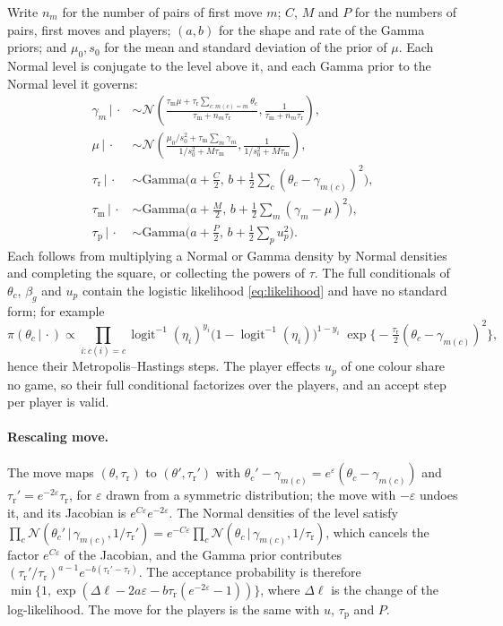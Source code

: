\documentclass[12pt]{article}
\newcommand{\given}{\,\vert\,}
\newcommand{\logistic}{\operatorname{logit}^{-1}}
\newcommand{\Normal}{\mathcal{N}}
\newcommand{\Gam}{\text{Gamma}}
\newcommand{\taum}{\tau_{\mathrm{m}}}
\newcommand{\taur}{\tau_{\mathrm{r}}}
\newcommand{\taup}{\tau_{\mathrm{p}}}
\begin{document}
Write $n_m$ for the number of pairs of first move $m$; $C$, $M$ and $P$ for the numbers of pairs, first moves and players; $(a, b)$ for the shape and rate of the Gamma priors; and $\mu_0, s_0$ for the mean and standard deviation of the prior of $\mu$. Each Normal level is conjugate to the level above it, and each Gamma prior to the Normal level it governs:
\begin{align*}
  \gamma_m \given \cdot &\sim \Normal\!\left(\frac{\taum \mu + \taur \sum_{c: m(c) = m} \theta_c}{\taum + n_m \taur}, \frac{1}{\taum + n_m \taur}\right),\\
  \mu \given \cdot &\sim \Normal\!\left(\frac{\mu_0 / s_0^2 + \taum \sum_m \gamma_m}{1/s_0^2 + M \taum}, \frac{1}{1/s_0^2 + M \taum}\right),\\
  \taur \given \cdot &\sim \Gam\Big(a + \tfrac{C}{2},\, b + \tfrac12 \sum_c (\theta_c - \gamma_{m(c)})^2\Big),\\
  \taum \given \cdot &\sim \Gam\Big(a + \tfrac{M}{2},\, b + \tfrac12 \sum_m (\gamma_m - \mu)^2\Big),\\
  \taup \given \cdot &\sim \Gam\Big(a + \tfrac{P}{2},\, b + \tfrac12 \sum_p u_p^2\Big).
\end{align*} Each follows from multiplying a Normal or Gamma density by Normal densities and completing the square, or collecting the powers of $\tau$. The full conditionals of $\theta_c$, $\beta_g$ and $u_p$ contain the logistic likelihood \eqref{eq:likelihood} and have no standard form; for example
\[
  \pi(\theta_c \given \cdot) \propto \prod_{i: c(i) = c} \logistic(\eta_i)^{y_i}\big(1 - \logistic(\eta_i)\big)^{1 - y_i}\; \exp\!\big\{-\tfrac{\taur}{2}(\theta_c - \gamma_{m(c)})^2\big\},
\]
hence their Metropolis--Hastings steps. The player effects $u_p$ of one colour share no game, so their full conditional factorizes over the players, and an accept step per player is valid.

\paragraph{Rescaling move.} The move maps $(\theta, \taur)$ to $(\theta', \taur')$ with $\theta_c' - \gamma_{m(c)} = e^{\varepsilon}(\theta_c - \gamma_{m(c)})$ and $\taur' = e^{-2\varepsilon}\taur$, for $\varepsilon$ drawn from a symmetric distribution; the move with $-\varepsilon$ undoes it, and its Jacobian is $e^{C\varepsilon}e^{-2\varepsilon}$. The Normal densities of the level satisfy $\prod_c \Normal(\theta_c' \given \gamma_{m(c)}, 1/\taur') = e^{-C\varepsilon}\prod_c \Normal(\theta_c \given \gamma_{m(c)}, 1/\taur)$, which cancels the factor $e^{C\varepsilon}$ of the Jacobian, and the Gamma prior contributes $(\taur'/\taur)^{a-1} e^{-b(\taur' - \taur)}$. The acceptance probability is therefore $\min\{1, \exp(\Delta\ell - 2a\varepsilon - b\taur(e^{-2\varepsilon} - 1))\}$, where $\Delta\ell$ is the change of the log-likelihood. The move for the players is the same with $u$, $\taup$ and $P$.
\end{document}
